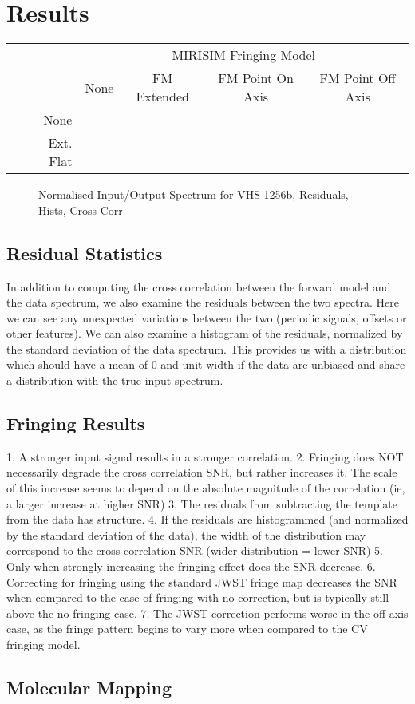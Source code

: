 \section{Results}
\begin{table}[h]
	\begin{tabular}{cr|c|c|c|c|}
		\toprule
		&& \multicolumn{4}{c}{MIRISIM Fringing Model}\\
		&& None & FM Extended & FM Point On Axis & FM Point Off Axis\\
		\midrule
		\parbox[t]{2mm}{}  & None & & & &\\[50pt]
		& Ext. Flat  & & & &\\[50pt]
		\bottomrule
	\end{tabular}
\end{table}
\begin{figure}[h]
	\caption{Normalised Input/Output Spectrum for VHS-1256b, Residuals, Hists, Cross Corr}
	\label{fig:CrossCor1D}
\end{figure}
\subsection{Residual Statistics}
In addition to computing the cross correlation between the forward model and the data spectrum, we also examine the residuals between the two spectra.
Here we can see any unexpected variations between the two (periodic signals, offsets or other features).
We can also examine a histogram of the residuals, normalized by the standard deviation of the data spectrum.
This provides us with a  distribution which should have a mean of 0 and unit width if the data are unbiased and share a distribution with the true input spectrum.
\subsection{Fringing Results}
1. A stronger input signal results in a stronger correlation.
2. Fringing does NOT necessarily degrade the cross correlation SNR, but rather increases it. The scale of this increase seems to depend on the absolute magnitude of the correlation (ie, a larger increase at higher SNR)
3. The residuals from subtracting the template from the data has structure.
4. If the residuals are histogrammed (and normalized by the standard deviation of the data), the width of the distribution may correspond to the cross correlation SNR (wider distribution = lower SNR)
5. Only when strongly increasing the fringing effect does the SNR decrease.
6. Correcting for fringing using the standard JWST fringe map decreases the SNR when compared to the case of fringing with no correction, but is typically still above the no-fringing case.
7. The JWST correction performs worse in the off axis case, as the fringe pattern begins to vary more when compared to the CV fringing model.
\subsection{Molecular Mapping}